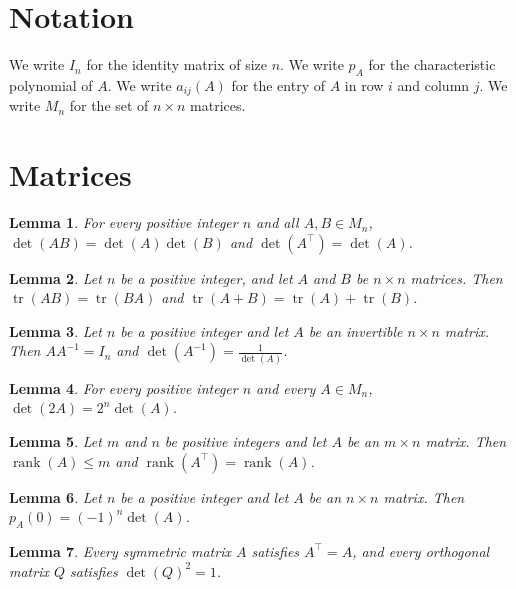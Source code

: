 \documentclass{article}
\newtheorem{lemma}{Lemma}
\begin{document}
\section{Notation}

We write $I_n$ for the identity matrix of size $n$.
We write $p_A$ for the characteristic polynomial of $A$.
We write $a_{ij}(A)$ for the entry of $A$ in row $i$ and column $j$.
We write $M_n$ for the set of $n\times n$ matrices.

\section{Matrices}

\begin{lemma}\label{determinant}
For every positive integer $n$ and all $A,B\in M_n$, $\det(AB)=\det(A)\det(B)$ and $\det(A^\top)=\det(A)$.
\end{lemma}

\begin{lemma}\label{trace}
Let $n$ be a positive integer, and let $A$ and $B$ be $n\times n$ matrices. Then $\operatorname{tr}(AB)=\operatorname{tr}(BA)$ and $\operatorname{tr}(A+B)=\operatorname{tr}(A)+\operatorname{tr}(B)$.
\end{lemma}

\begin{lemma}\label{inverse}
Let $n$ be a positive integer and let $A$ be an invertible $n\times n$ matrix. Then $AA^{-1}=I_n$ and $\det(A^{-1})=\frac{1}{\det(A)}$.
\end{lemma}

\begin{lemma}\label{scalar}
For every positive integer $n$ and every $A\in M_n$, $\det(2A)=2^n\det(A)$.
\end{lemma}

\begin{lemma}\label{rank}
Let $m$ and $n$ be positive integers and let $A$ be an $m\times n$ matrix. Then $\operatorname{rank}(A)\le m$ and $\operatorname{rank}(A^\top)=\operatorname{rank}(A)$.
\end{lemma}

\begin{lemma}\label{charpoly}
Let $n$ be a positive integer and let $A$ be an $n\times n$ matrix. Then $p_A(0)=(-1)^n\det(A)$.
\end{lemma}

\begin{lemma}\label{symmetric}
Every symmetric matrix $A$ satisfies $A^\top=A$, and every orthogonal matrix $Q$ satisfies $\det(Q)^2=1$.
\end{lemma}
\end{document}
